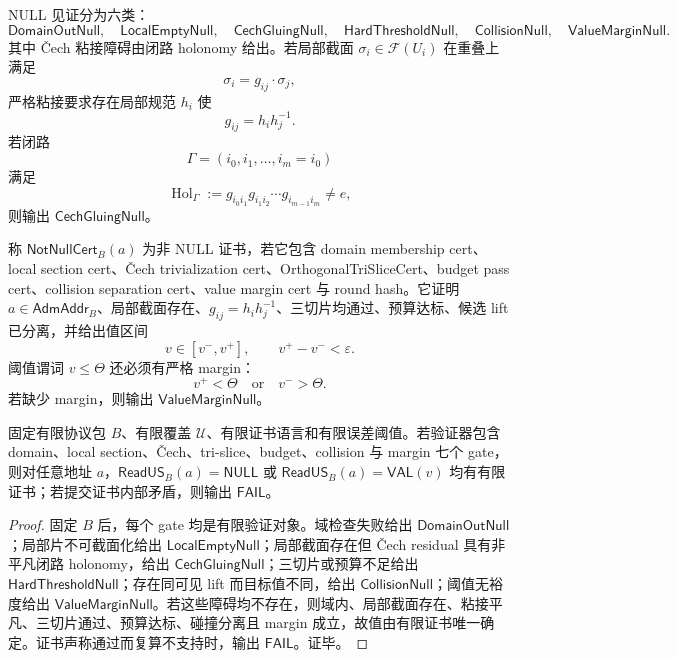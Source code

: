 NULL 见证分为六类：
\[
\mathsf{DomainOutNull},\quad
\mathsf{LocalEmptyNull},\quad
\mathsf{CechGluingNull},\quad
\mathsf{HardThresholdNull},\quad
\mathsf{CollisionNull},\quad
\mathsf{ValueMarginNull}.
\]
其中 Čech 粘接障碍由闭路 holonomy 给出。若局部截面 \(\sigma_i\in\mathcal F(U_i)\) 在重叠上满足
\[
\sigma_i=g_{ij}\cdot\sigma_j,
\]
严格粘接要求存在局部规范 \(h_i\) 使
\[
g_{ij}=h_i h_j^{-1}.
\]
若闭路
\[
\Gamma=(i_0,i_1,\ldots,i_m=i_0)
\]
满足
\[
\operatorname{Hol}_\Gamma
:=
g_{i_0i_1}g_{i_1i_2}\cdots g_{i_{m-1}i_m}
\ne e,
\]
则输出 \(\mathsf{CechGluingNull}\)。

\begin{definition}[非 NULL 证书]\label{def:typed-address-biaxial-completion-not-null-cert}
称 \(\mathsf{NotNullCert}_B(a)\) 为非 NULL 证书，若它包含 domain membership cert、local section cert、Čech trivialization cert、OrthogonalTriSliceCert、budget pass cert、collision separation cert、value margin cert 与 round hash。它证明 \(a\in\mathsf{AdmAddr}_B\)、局部截面存在、\(g_{ij}=h_i h_j^{-1}\)、三切片均通过、预算达标、候选 lift 已分离，并给出值区间
\[
v\in[v^-,v^+],
\qquad v^+-v^-<\varepsilon.
\]
阈值谓词 \(v\le\Theta\) 还必须有严格 margin：
\[
v^+<\Theta
\quad\text{or}\quad
v^->\Theta.
\]
若缺少 margin，则输出 \(\mathsf{ValueMarginNull}\)。
\end{definition}

\begin{theorem}\label{thm:typed-address-biaxial-completion-null-not-null-finite-closure}
固定有限协议包 \(B\)、有限覆盖 \(\mathcal U\)、有限证书语言和有限误差阈值。若验证器包含 domain、local section、Čech、tri-slice、budget、collision 与 margin 七个 gate，则对任意地址 \(a\)，\(\mathsf{ReadUS}_B(a)=\mathsf{NULL}\) 或 \(\mathsf{ReadUS}_B(a)=\mathsf{VAL}(v)\) 均有有限证书；若提交证书内部矛盾，则输出 \(\mathsf{FAIL}\)。
\end{theorem}
\begin{proof}
固定 \(B\) 后，每个 gate 均是有限验证对象。域检查失败给出 \(\mathsf{DomainOutNull}\)；局部片不可截面化给出 \(\mathsf{LocalEmptyNull}\)；局部截面存在但 Čech residual 具有非平凡闭路 holonomy，给出 \(\mathsf{CechGluingNull}\)；三切片或预算不足给出 \(\mathsf{HardThresholdNull}\)；存在同可见 lift 而目标值不同，给出 \(\mathsf{CollisionNull}\)；阈值无裕度给出 \(\mathsf{ValueMarginNull}\)。若这些障碍均不存在，则域内、局部截面存在、粘接平凡、三切片通过、预算达标、碰撞分离且 margin 成立，故值由有限证书唯一确定。证书声称通过而复算不支持时，输出 \(\mathsf{FAIL}\)。证毕。
\end{proof}

